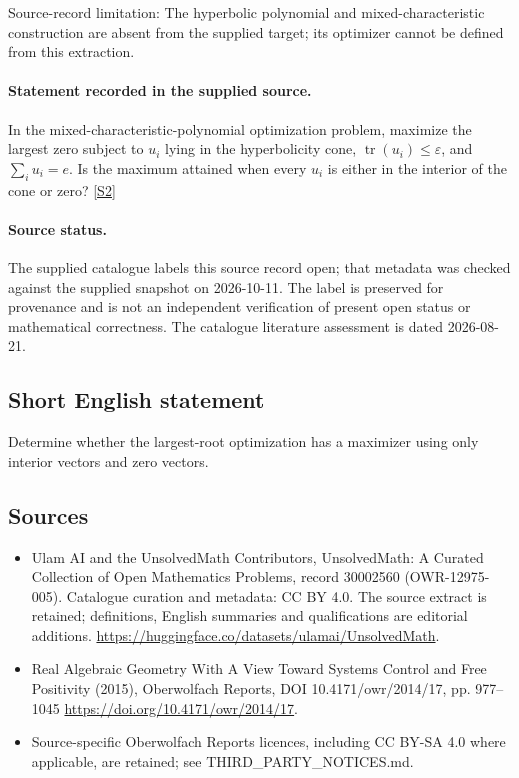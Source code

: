 \documentclass[11pt]{article}
\begin{document}
Source-record limitation: The hyperbolic polynomial and mixed-characteristic construction are absent from the supplied target; its optimizer cannot be defined from this extraction.
\paragraph{Statement recorded in the supplied source.}
In the mixed-characteristic-polynomial optimization problem, maximize the largest zero subject to $u_i$ lying in the hyperbolicity cone, $\operatorname{tr}(u_i)\leq\varepsilon$, and $\sum_i u_i=e$. Is the maximum attained when every $u_i$ is either in the interior of the cone or zero? \href{https://doi.org/10.4171/owr/2014/17}{[S2]}
\paragraph{Source status.}
The supplied catalogue labels this source record open; that metadata was checked against the supplied snapshot on 2026-10-11. The label is preserved for provenance and is not an independent verification of present open status or mathematical correctness. The catalogue literature assessment is dated 2026-08-21.
\subsection{Short English statement}
Determine whether the largest-root optimization has a maximizer using only interior vectors and zero vectors.
\subsection{Sources}
\begin{itemize}
\item[S1] Ulam AI and the UnsolvedMath Contributors, UnsolvedMath: A Curated Collection of Open Mathematics Problems, record 30002560 (OWR-12975-005). Catalogue curation and metadata: CC BY 4.0. The source extract is retained; definitions, English summaries and qualifications are editorial additions.
\url{https://huggingface.co/datasets/ulamai/UnsolvedMath}.
\item[S2] Real Algebraic Geometry With A View Toward Systems Control and Free Positivity (2015), Oberwolfach Reports, DOI 10.4171/owr/2014/17, pp. 977--1045
\url{https://doi.org/10.4171/owr/2014/17}.
\item Source-specific Oberwolfach Reports licences, including CC BY-SA 4.0 where applicable, are retained; see THIRD\_PARTY\_NOTICES.md.
\end{itemize}
\end{document}
